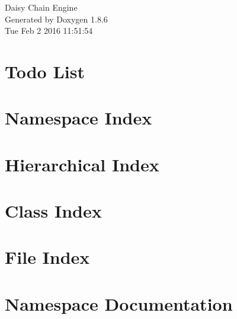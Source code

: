 \documentclass[twoside]{book}
\newcommand{\clearemptydoublepage}{%
  \newpage{\pagestyle{empty}\cleardoublepage}%
}
\begin{document}
\hypersetup{pageanchor=false}
\begin{titlepage}
\vspace*{7cm}
\begin{center}%
{\Large Daisy Chain Engine }\\
\vspace*{1cm}
{\large Generated by Doxygen 1.8.6}\\
\vspace*{0.5cm}
{\small Tue Feb 2 2016 11:51:54}\\
\end{center}
\end{titlepage}
\clearemptydoublepage
\tableofcontents
\clearemptydoublepage
{}
\hypersetup{pageanchor=true}

\chapter{Todo List}
\label{todo}
\hypertarget{todo}{}

\chapter{Namespace Index}

\chapter{Hierarchical Index}

\chapter{Class Index}

\chapter{File Index}

\chapter{Namespace Documentation}

\end{document}
